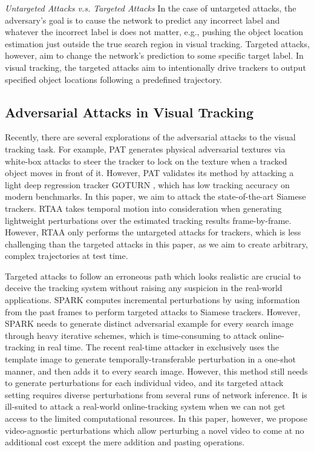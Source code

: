 \documentclass[journal]{IEEEtran}
\newcommand{\eg}{e.g.}
\begin{document}
\textit{Untargeted Attacks v.s. Targeted Attacks} In the case of untargeted attacks, the adversary's goal is to cause the network to predict any incorrect label and whatever the incorrect label is does not matter, \eg, pushing the object location estimation just outside the true search region in visual tracking.
Targeted attacks, however, aim to change the network's prediction to some specific target label. In visual tracking, the targeted attacks aim to intentionally drive trackers to output specified object locations following a predefined trajectory.

\subsection{Adversarial Attacks in Visual Tracking}

Recently, there are several explorations of the adversarial attacks to the visual tracking task. For example, PAT \cite{PAT} generates physical adversarial textures via white-box attacks to steer the tracker to lock on the texture when a tracked object moves in front of it. However, PAT validates its method by attacking a light deep regression tracker GOTURN \cite{GOTURN}, which has low tracking accuracy on modern benchmarks. In this paper, we aim to attack the state-of-the-art Siamese trackers.
RTAA \cite{RTAA} takes temporal motion into consideration when generating lightweight perturbations over the estimated tracking results frame-by-frame. However, RTAA only performs the untargeted attacks for trackers, which is less challenging than the targeted attacks in this paper, as we aim to create arbitrary, complex trajectories at test time. 

Targeted attacks to follow an erroneous path which looks realistic are crucial to deceive the tracking system without raising any suspicion in the real-world applications.
SPARK \cite{SPARK} computes incremental perturbations by using information from the past frames to perform targeted attacks to Siamese trackers. However, SPARK needs to generate distinct adversarial example for every search image through heavy iterative schemes, which is time-consuming to attack online-tracking in real time. The recent real-time attacker in \cite{TTP} exclusively uses the template image to generate temporally-transferable perturbation in a one-shot manner, and then adds it to every search image. However, this method still needs to generate perturbations for each individual video, and its targeted attack setting requires diverse perturbations from several runs of network inference. It is ill-suited to attack a real-world online-tracking system when we can not get access to the limited computational resources. In this paper, however, we propose video-agnostic perturbations which allow perturbing a novel video to come at no additional cost except the mere addition and pasting operations.
\end{document}
